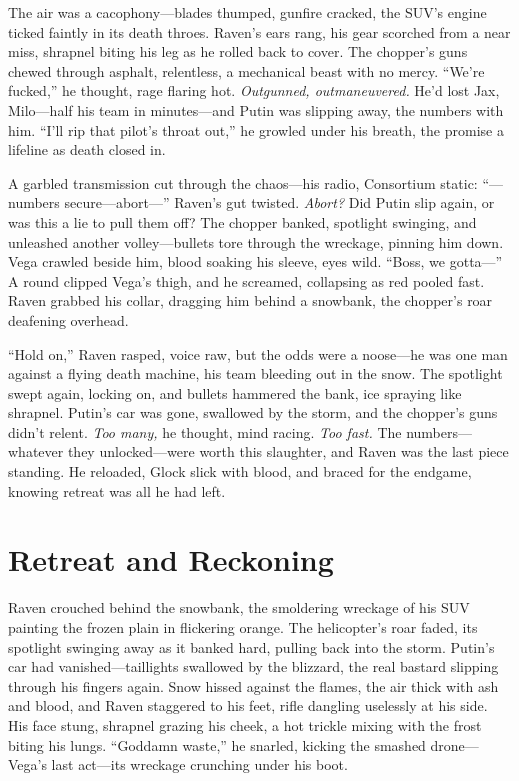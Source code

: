 \documentclass[12pt]{book}
\begin{document}
The air was a cacophony—blades thumped, gunfire cracked, the SUV’s engine ticked faintly in its death throes. Raven’s ears rang, his gear scorched from a near miss, shrapnel biting his leg as he rolled back to cover. The chopper’s guns chewed through asphalt, relentless, a mechanical beast with no mercy. “We’re fucked,” he thought, rage flaring hot. \textit{Outgunned, outmaneuvered.} He’d lost Jax, Milo—half his team in minutes—and Putin was slipping away, the numbers with him. “I’ll rip that pilot’s throat out,” he growled under his breath, the promise a lifeline as death closed in.

A garbled transmission cut through the chaos—his radio, Consortium static: “—numbers secure—abort—” Raven’s gut twisted. \textit{Abort?} Did Putin slip again, or was this a lie to pull them off? The chopper banked, spotlight swinging, and unleashed another volley—bullets tore through the wreckage, pinning him down. Vega crawled beside him, blood soaking his sleeve, eyes wild. “Boss, we gotta—” A round clipped Vega’s thigh, and he screamed, collapsing as red pooled fast. Raven grabbed his collar, dragging him behind a snowbank, the chopper’s roar deafening overhead.

“Hold on,” Raven rasped, voice raw, but the odds were a noose—he was one man against a flying death machine, his team bleeding out in the snow. The spotlight swept again, locking on, and bullets hammered the bank, ice spraying like shrapnel. Putin’s car was gone, swallowed by the storm, and the chopper’s guns didn’t relent. \textit{Too many,} he thought, mind racing. \textit{Too fast.} The numbers—whatever they unlocked—were worth this slaughter, and Raven was the last piece standing. He reloaded, Glock slick with blood, and braced for the endgame, knowing retreat was all he had left.

\section{Retreat and Reckoning}

Raven crouched behind the snowbank, the smoldering wreckage of his SUV painting the frozen plain in flickering orange. The helicopter’s roar faded, its spotlight swinging away as it banked hard, pulling back into the storm. Putin’s car had vanished—taillights swallowed by the blizzard, the real bastard slipping through his fingers again. Snow hissed against the flames, the air thick with ash and blood, and Raven staggered to his feet, rifle dangling uselessly at his side. His face stung, shrapnel grazing his cheek, a hot trickle mixing with the frost biting his lungs. “Goddamn waste,” he snarled, kicking the smashed drone—Vega’s last act—its wreckage crunching under his boot.
\end{document}
